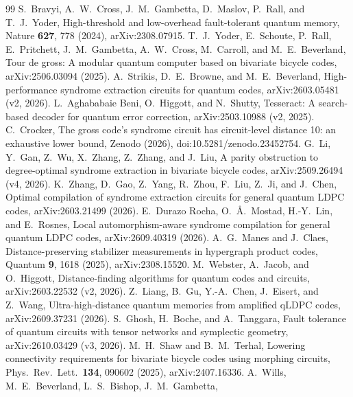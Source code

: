 \documentclass[aps,prl,twocolumn,superscriptaddress,nofootinbib]{revtex4-2}
\begin{document}
\begin{thebibliography}{99}
 S.~Bravyi, A.~W.~Cross, J.~M.~Gambetta, D.~Maslov, P.~Rall, and
T.~J.~Yoder, High-threshold and low-overhead fault-tolerant quantum memory,
Nature \textbf{627}, 778 (2024), arXiv:2308.07915.
 T.~J.~Yoder, E.~Schoute, P.~Rall, E.~Pritchett,
J.~M.~Gambetta, A.~W.~Cross, M.~Carroll, and M.~E.~Beverland, Tour de gross: A
modular quantum computer based on bivariate bicycle codes, arXiv:2506.03094 (2025).
 A.~Strikis, D.~E.~Browne, and M.~E.~Beverland,
High-performance syndrome extraction circuits for quantum codes,
arXiv:2603.05481 (v2, 2026).
 L.~Aghababaie Beni, O.~Higgott, and N.~Shutty, Tesseract: A
search-based decoder for quantum error correction, arXiv:2503.10988 (v2, 2025).
 C.~Crocker, The gross code's syndrome circuit has circuit-level
distance 10: an exhaustive lower bound, Zenodo (2026), doi:10.5281/zenodo.23452754.
 G.~Li, Y.~Gan, Z.~Wu, X.~Zhang, Z.~Zhang, and J.~Liu, A parity
obstruction to degree-optimal syndrome extraction in bivariate bicycle codes,
arXiv:2509.26494 (v4, 2026).
 K.~Zhang, D.~Gao, Z.~Yang, R.~Zhou, F.~Liu, Z.~Ji, and J.~Chen,
Optimal compilation of syndrome extraction circuits for general quantum LDPC codes,
arXiv:2603.21499 (2026).
 E.~Durazo Rocha, O.~\AA.~Mostad, H.-Y.~Lin, and E.~Rosnes,
Local automorphism-aware syndrome compilation for general quantum LDPC codes,
arXiv:2609.40319 (2026).
 A.~G.~Manes and J.~Claes, Distance-preserving stabilizer
measurements in hypergraph product codes, Quantum \textbf{9}, 1618 (2025),
arXiv:2308.15520.
 M.~Webster, A.~Jacob, and O.~Higgott, Distance-finding
algorithms for quantum codes and circuits, arXiv:2603.22532 (v2, 2026).
 Z.~Liang, B.~Gu, Y.-A.~Chen, J.~Eisert, and Z.~Wang,
Ultra-high-distance quantum memories from amplified qLDPC codes,
arXiv:2609.37231 (2026).
 S.~Ghosh, H.~Boche, and A.~Tanggara, Fault tolerance of quantum
circuits with tensor networks and symplectic geometry, arXiv:2610.03429 (v3, 2026).
 M.~H.~Shaw and B.~M.~Terhal, Lowering connectivity
requirements for bivariate bicycle codes using morphing circuits, Phys.\ Rev.\
Lett.\ \textbf{134}, 090602 (2025), arXiv:2407.16336.
 A.~Wills, M.~E.~Beverland, L.~S.~Bishop, J.~M.~Gambetta,

\end{thebibliography}
\end{document}

